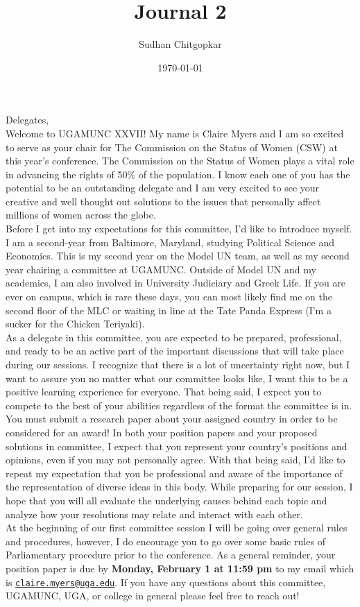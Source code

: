 \documentclass[10pt, letterpaper]{article}
\title{Journal 2}
\author{Sudhan Chitgopkar}
\date{\today}
\begin{document}
Delegates, \\

Welcome to UGAMUNC XXVII! My name is Claire Myers and I am so excited to
serve as your chair for The Commission on the Status of Women (CSW) at
this year's conference. The Commission on the Status of Women plays a
vital role in advancing the rights of 50\% of the population. I know
each one of you has the potential to be an outstanding delegate and I am
very excited to see your creative and well thought out solutions to the
issues that personally affect millions of women across the globe. \\

Before I get into my expectations for this committee, I'd like to
introduce myself. I am a second-year from Baltimore, Maryland, studying
Political Science and Economics. This is my second year on the Model UN
team, as well as my second year chairing a committee at UGAMUNC. Outside
of Model UN and my academics, I am also involved in University Judiciary
and Greek Life. If you are ever on campus, which is rare these days, you
can most likely find me on the second floor of the MLC or waiting in
line at the Tate Panda Express (I'm a sucker for the Chicken Teriyaki). \\

As a delegate in this committee, you are expected to be prepared,
professional, and ready to be an active part of the important
discussions that will take place during our sessions. I recognize that
there is a lot of uncertainty right now, but I want to assure you no
matter what our committee looks like, I want this to be a positive
learning experience for everyone. That being said, I expect you to
compete to the best of your abilities regardless of the format the
committee is in. You must submit a research paper about your assigned
country in order to be considered for an award! In both your position
papers and your proposed solutions in committee, I expect that you
represent your country's positions and opinions, even if you may not
personally agree. With that being said, I'd like to repeat my
expectation that you be professional and aware of the importance of the
representation of diverse ideas in this body. While preparing for our
session, I hope that you will all evaluate the underlying causes behind
each topic and analyze how your resolutions may relate and interact with
each other. \\

At the beginning of our first committee session I will be going over
general rules and procedures, however, I do encourage you to go over
some basic rules of Parliamentary procedure prior to the conference. As
a general reminder, your position paper is due by \textbf{Monday,
February 1 at 11:59 pm} to my email which is
\texttt{\href{mailto:claire.myers@uga.edu}{claire.myers@uga.edu}}.
If you have any questions about this committee, UGAMUNC, UGA, or college
in general please feel free to reach out! \\
\end{document}
